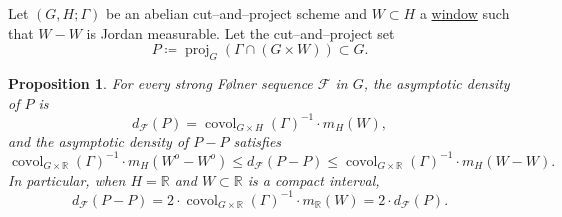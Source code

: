 \documentclass{amsart}
\numberwithin{equation}{subsection}
\newtheorem{prop}[thm]{Proposition}
\theoremstyle{remark}
\begin{document}
Let \(\left(G,H;\Gamma\right)\) be an abelian cut--and--project scheme and \(W\subset H\) a \hyperlink{window}{window} such that \(W-W\) is Jordan measurable. Let the cut--and--project set
\[P\coloneqq\operatorname{proj}_{G}\left(\Gamma\cap\left(G\times W\right)\right)\subset G.\]

\begin{prop}\label{prop:denscap}
For every strong F\o lner sequence \(\mathcal{F}\) in \(G\), the asymptotic density of \(P\) is
\[d_{\mathcal{F}}\left(P\right)=\operatorname{covol}_{G\times H}\left(\Gamma\right)^{-1}\cdot m_{H}\left(W\right),\]
and the asymptotic density of \(P-P\) satisfies
\[\operatorname{covol}_{G\times\mathbb{R}}\left(\Gamma\right)^{-1}\cdot m_{H}\left(W^{o}-W^{o}\right)\leq d_{\mathcal{F}}\left(P-P\right)\leq\operatorname{covol}_{G\times\mathbb{R}}\left(\Gamma\right)^{-1}\cdot m_{H}\left(W-W\right).\]
In particular, when \(H=\mathbb{R}\) and \(W\subset\mathbb{R}\) is a compact interval,
\[d_{\mathcal{F}}\left(P-P\right)=2\cdot\operatorname{covol}_{G\times\mathbb{R}}\left(\Gamma\right)^{-1}\cdot m_{\mathbb{R}}\left(W\right)=2\cdot d_{\mathcal{F}}\left(P\right).\]
\end{prop}
\end{document}

